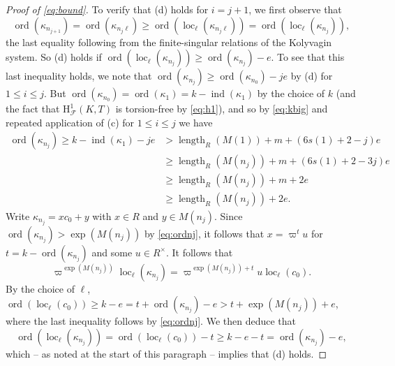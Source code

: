 \documentclass[a4paper,10pt]{amsart}
\numberwithin{equation}{section}
\numberwithin{equation}{section}
\theoremstyle{plain}
\theoremstyle{definition}
\theoremstyle{definition}
\theoremstyle{plain}
\theoremstyle{plain}
\theoremstyle{plain}
\theoremstyle{plain}
\DeclareMathOperator{\ord}{ord}
\newcommand{\ind}{\operatorname{ind}}
\DeclareMathOperator{\loc}{loc}
\DeclareMathOperator{\length}{length}
\newcommand{\CF}{\mathcal{F}}
\newcommand{\kap}{\kappa}
\newcommand{\fm}{\mathfrak{m}}
\newcommand{\rH}{\mathrm{H}}
\begin{document}
\begin{proof}[Proof of \eqref{eq:bound}]


To verify that (d) holds for $i=j+1$, we first observe that 
$$
\ord(\kap_{n_{j+1}}) = \ord(\kap_{n_{j}\ell}) \geqslant \ord(\loc_{\ell}(\kap_{n_{j}\ell}))= \ord(\loc_\ell(\kap_{n_{j}})),
$$
the last equality following from the finite-singular relations of the Kolyvagin system.
So (d) holds if $\ord(\loc_\ell(\kap_{n_{j}})) \geqslant \ord(\kap_{n_{j}})-e$.
To see that this last inequality holds, we note that
$\ord(\kap_{n_{j}}) \geq \ord(\kap_{n_0}) - je$ by (d) for $1\leqslant i \leqslant j$. 
But $\ord(\kap_{n_0}) =\ord(\kap_1)= k-\ind(\kap_1)$ by the choice of $k$ (and the fact that $\rH^1_{\CF}(K,T)$ is torsion-free by \eqref{eq:h1}), 
and so by \eqref{eq:kbig} and repeated application of (c) for $1\leq i\leq j$ we have
\begin{equation}\label{eq:ordnj}\begin{split}
\ord(\kap_{n_j}) \geq k-\ind(\kap_1) - je & >  \length_R(M(1))+m+(6s(1)+2-j)e \\
& \geq \length_R(M(n_j))+m+(6s(1)+2-3j)e   \\
& \geq  \length_R(M(n_j)) + m + 2e  \\
& \geq  \length_R(M(n_j)) + 2e.
\end{split}\end{equation}
Write $\kap_{n_{j}} = x c_0 + y$ with $x\in R$ and $y \in M(n_j)$. 
Since $\ord(\kap_{n_j}) > \exp(M(n_j))$ by \eqref{eq:ordnj}, it follows that 
$x = \varpi^t u$ for $t = k-\ord(\kap_{n_{j}})$ and some $u\in R^\times$. 
It follows that
$$
\varpi^{\exp(M(n_{j}))}\loc_\ell(\kap_{n_j}) = \varpi^{\exp(M(n_{j}))+t} u\loc_\ell(c_0).
$$
By the choice of $\ell$, $\ord(\loc_\ell(c_0)) \geqslant k - e = t+\ord(\kap_{n_j}) - e > t+{\exp(M(n_{j}))}+e$, where the last inequality follows by
\eqref{eq:ordnj}. We then deduce that
$$
\ord(\loc_\ell(\kap_{n_j})) = \ord(\loc_\ell(c_0)) - t \geq k - e -t = \ord(\kap_{n_j})-e,
$$
which -- as noted at the start of this paragraph -- implies that (d) holds.


\end{proof}
\end{document}
